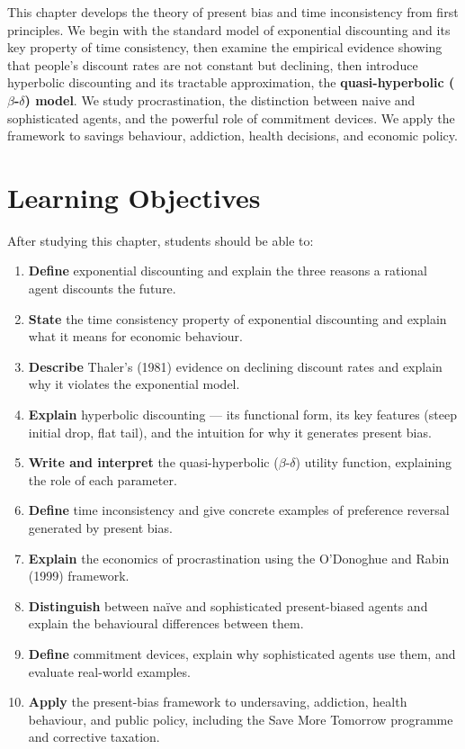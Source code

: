 \documentclass[12pt, letterpaper]{article}
\begin{document}
This chapter develops the theory of present bias and time inconsistency from first principles. We begin with the standard model of exponential discounting and its key property of time consistency, then examine the empirical evidence showing that people's discount rates are not constant but declining, then introduce hyperbolic discounting and its tractable approximation, the \textbf{quasi-hyperbolic ($\beta$-$\delta$) model}. We study procrastination, the distinction between naive and sophisticated agents, and the powerful role of commitment devices. We apply the framework to savings behaviour, addiction, health decisions, and economic policy.

\medskip


\section*{Learning Objectives}


After studying this chapter, students should be able to:

\begin{enumerate}
\item \textbf{Define} exponential discounting and explain the three reasons a rational agent discounts the future.
\item \textbf{State} the time consistency property of exponential discounting and explain what it means for economic behaviour.
\item \textbf{Describe} Thaler's (1981) evidence on declining discount rates and explain why it violates the exponential model.
\item \textbf{Explain} hyperbolic discounting --- its functional form, its key features (steep initial drop, flat tail), and the intuition for why it generates present bias.
\item \textbf{Write and interpret} the quasi-hyperbolic ($\beta$-$\delta$) utility function, explaining the role of each parameter.
\item \textbf{Define} time inconsistency and give concrete examples of preference reversal generated by present bias.
\item \textbf{Explain} the economics of procrastination using the O'Donoghue and Rabin (1999) framework.
\item \textbf{Distinguish} between naïve and sophisticated present-biased agents and explain the behavioural differences between them.
\item \textbf{Define} commitment devices, explain why sophisticated agents use them, and evaluate real-world examples.
\item \textbf{Apply} the present-bias framework to undersaving, addiction, health behaviour, and public policy, including the Save More Tomorrow programme and corrective taxation.
\end{enumerate}
\end{document}
